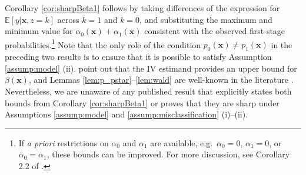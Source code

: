 Corollary \ref{cor:sharpBeta1} follows by taking differences of the expression for $\mathbb{E}[y|\mathbf{x},z=k]$ across $k=1$ and $k=0$, and substituting the maximum and minimum value for $\alpha_0(\mathbf{x}) + \alpha_1(\mathbf{x})$ consistent with the observed first-stage probabilities.\footnote{If \emph{a priori} restrictions on $\alpha_0$ and $\alpha_1$ are available, e.g.\ $\alpha_0 = 0$, $\alpha_1 = 0$, or $\alpha_0 = \alpha_1$, these bounds can be improved. For more discussion, see Corollary 2.2 of \cite{DiTragliaGarciaWP2017}.}
Note that the only role of the condition $p_0(\mathbf{x}) \neq p_1(\mathbf{x})$ in the preceding two results is to ensure that it is possible to satisfy Assumption \ref{assump:model} (ii).
\cite{FL} point out that the IV estimand provides an upper bound for $\beta(\mathbf{x})$, and Lemmas \ref{lem:p_pstar}--\ref{lem:wald} are well-known in the literature \citep[see e.g.][]{FL,Mahajan}.
Nevertheless, we are unaware of any published result that explicitly states both bounds from Corollary \ref{cor:sharpBeta1} or proves that they are sharp under Assumptions \ref{assump:model} and \ref{assump:misclassification} (i)--(ii).

